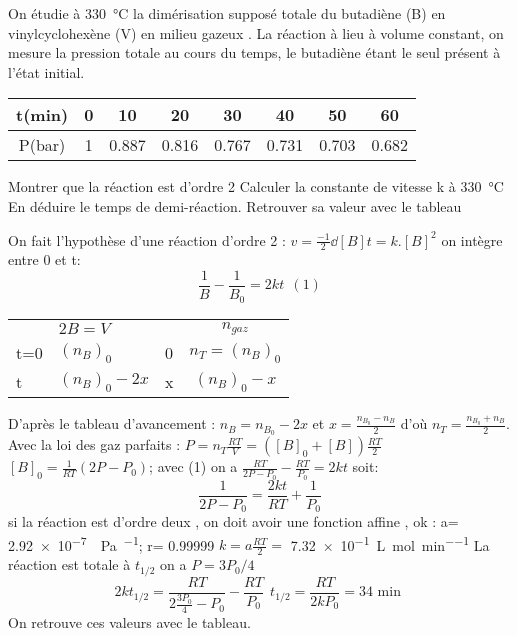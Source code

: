 \begin{Exercise}[title=Dimérisation du butadiène]
	On étudie à \SI{330}{\celsius} la dimérisation supposé totale du butadiène (B) en vinylcyclohexène (V) en milieu gazeux .
	La réaction à lieu à volume constant, on mesure la pression  totale au cours du temps, le butadiène étant le seul présent à l'état initial.
	\begin{center}
		\begin{tabular}{|c|c|c|c|c|c|c|c|}
			\hline
			t(min) & 0 & 10    & 20    & 30    & 40    & 50    & 60    \\
			\hline
			P(bar) & 1 & 0.887 & 0.816 & 0.767 & 0.731 & 0.703 & 0.682 \\
			\hline
		\end{tabular}
	\end{center}
	\Question Montrer que la réaction est d'ordre 2
	\Question Calculer la constante de vitesse k à \SI{330}{\celsius}
	\Question En déduire le temps de demi-réaction. Retrouver sa valeur avec le tableau
\end{Exercise}
\begin{Answer}
	\Question
	On fait l'hypothèse d'une réaction d'ordre 2 : $ v= \frac{-1}{2}\dd{[B]}{t}=k.[B]^2$ on intègre entre 0 et  t: \[ \frac{1}{B}-\frac{1}{B_0}=2kt ~~(1) \]
	\begin{tabular}{lllc}
		    & \multicolumn{2}{l}{$2B = V$} & $n_{gaz}$                 \\
		t=0 & $(n_B)_0$                    & 0         & $n_T=(n_B)_0$ \\
		t   & $(n_B)_0-2x$                 & x         & $(n_B)_0-x$   \\
	\end{tabular}
	D'après le tableau d'avancement : $n_B=n_{B_0}-2x$ et $x= \frac{n_{B_0}-n_B}{2}$ d'où $n_T=\frac{n_{B_0}+n_B}{2}$. \\
	Avec la loi des gaz parfaits : $P=n_T \frac{RT}{V}=([B]_0+[B])\frac{RT}{2}$\\
	$[B]_0= \frac{1}{RT}(2P-P_0) $; avec (1) on a $\frac{RT}{2P-P_0}-\frac{RT}{P_0}=2kt$ soit:
	\[ \frac{1}{2P-P_0}=\frac{2kt}{RT}+\frac{1}{P_0}\]
	si la réaction est d'ordre deux , on doit avoir une fonction affine , ok :
	a= \SI{2.92e-7}{\per\Pa\per\min}; r= 0.99999
	\Question $k= a \frac{RT}{2} = $ \SI{7.32e-1}{\L\per\mol\per\minute}
	\Question La réaction est totale à $t_{1/2}$  on a $P=3P_0/4$
	\[2kt_{1/2}=\frac{RT}{2\frac{3P_0}{4}-P_0}-\frac{RT}{P_0} ~~ t_{1/2}= \frac{RT}{2kP_0}=34 \text{ min }\]
	On retrouve ces valeurs avec le tableau.
\end{Answer}
